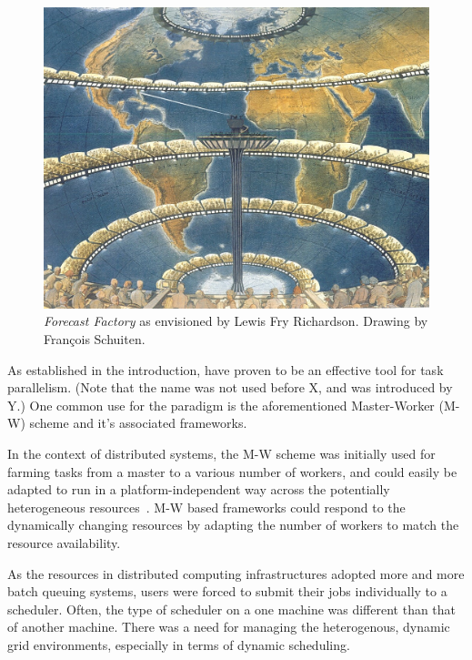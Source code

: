 \documentclass{sig-alternate}
\begin{document}
\begin{figure}[t]
	\centering
		\includegraphics[width=.45\textwidth]{figures/forecast-factory.jpg}
	\caption{\textit{Forecast Factory} as envisioned by Lewis Fry Richardson.
    Drawing by Fran{\c c}ois Schuiten.}
	\label{fig:figures_forecast-factory}
\end{figure}

As established in the introduction, \pilotjobs have proven to be an
effective tool for task parallelism.  (Note that the name
\textit{\pilotjob} was not used before X, and was introduced by Y.)
One common use for the \pilotjob paradigm is the aforementioned
Master-Worker (M-W) scheme and it's associated
frameworks. 

In the context of distributed systems, the M-W scheme was initially used for
farming tasks from a master to a various number of workers, and could easily be
adapted to run in a platform-independent way across the potentially
heterogeneous resources~\cite{masterworker, Goux00anenabling}.
M-W based frameworks could respond to the dynamically changing resources by
adapting the number of workers to match the resource availability.

As the resources in distributed computing infrastructures adopted more and more
batch queuing systems, users were forced to submit their jobs individually to a
scheduler.  
Often, the type of scheduler on a one machine was different than that of
another machine. There was a need for managing the heterogenous, dynamic grid environments,
especially in terms of dynamic scheduling.
\end{document}
